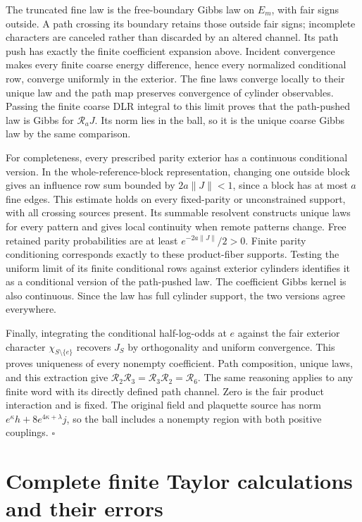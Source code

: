 The truncated fine law is the free-boundary Gibbs law on \(E_m\), with
fair signs outside. A path crossing its boundary retains those outside
fair signs; incomplete characters are canceled rather than discarded by
an altered channel. Its path push has exactly the finite coefficient
expansion above. Incident convergence makes every finite coarse energy
difference, hence every normalized conditional row, converge uniformly in
the exterior. The fine laws converge locally to their unique law and the
path map preserves convergence of cylinder observables. Passing the finite
coarse DLR integral to this limit proves that the path-pushed law is Gibbs
for \(\mathcal R_aJ\). Its norm lies in the ball, so it is the unique
coarse Gibbs law by the same comparison.

For completeness, every prescribed parity exterior has a continuous
conditional version. In the whole-reference-block representation,
changing one outside block gives an influence row sum bounded by
\(2a\|J\|<1\), since a block has at most \(a\) fine edges. This estimate
holds on every fixed-parity or unconstrained support, with all crossing
sources present. Its summable resolvent constructs unique laws for every
pattern and gives local continuity when remote patterns change. Free
retained parity probabilities are at least
\(e^{-2a\|J\|}/2>0\). Finite parity conditioning corresponds exactly to
these product-fiber supports. Testing the uniform limit of its finite
conditional rows against exterior cylinders identifies it as a conditional
version of the path-pushed law. The coefficient Gibbs kernel is also
continuous. Since the law has full cylinder support, the two versions
agree everywhere.

Finally, integrating the conditional half-log-odds at \(e\) against the
fair exterior character \(\chi_{S\setminus\{e\}}\) recovers \(J_S\)
by orthogonality and uniform convergence. This proves uniqueness of every
nonempty coefficient. Path composition, unique laws, and this extraction
give \(\mathcal R_2\mathcal R_3=\mathcal R_3\mathcal R_2=\mathcal R_6\).
The same reasoning applies to any finite word with its directly defined
path channel. Zero is the fair product interaction and is fixed. The
original field and plaquette source has norm
\(e^\kappa h+8e^{4\kappa+\lambda}j\), so the ball includes a nonempty
region with both positive couplings. \hfill\(\square\)

\section{Complete finite Taylor calculations and their errors}
\label{sec:rg-spatial-proof-finite-amplitude}

